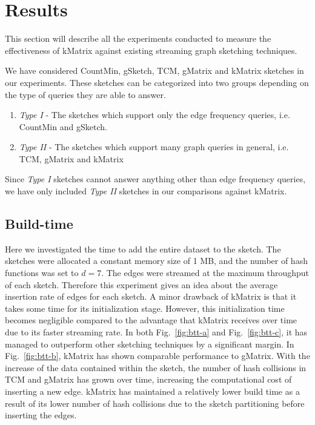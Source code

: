\section{Results}
\label{sec:results}

This section will describe all the experiments conducted to measure the effectiveness of kMatrix against existing streaming graph sketching techniques. 

We have considered CountMin, gSketch, TCM, gMatrix and kMatrix sketches in our experiments. These sketches can be categorized into two groups depending on the type of queries they are able to answer.

\begin{enumerate}
    \item \emph{Type I} - The sketches which support only the edge frequency queries, i.e. CountMin and gSketch.
    \item \emph{Type II} - The sketches which support many graph queries in general, i.e. TCM, gMatrix and kMatrix
\end{enumerate}

Since \emph{Type I} sketches cannot answer anything other than edge frequency queries, we have only included \emph{Type II} sketches in our comparisons against kMatrix.

\subsection{Build-time}

Here we investigated the time to add the entire dataset to the sketch. The sketches were allocated a constant memory size of 1 MB, and the number of hash functions was set to \(d = 7\). The edges were streamed at the maximum throughput of each sketch. Therefore this experiment gives an idea about the average insertion rate of edges for each sketch. A minor drawback of kMatrix is that it takes some time for its initialization stage. However, this initialization time becomes negligible compared to the advantage that kMatrix receives over time due to its faster streaming rate. In both Fig.~\ref{fig:btt-a} and Fig.~\ref{fig:btt-c}, it has managed to outperform other sketching techniques by a significant margin. In Fig.~\ref{fig:btt-b}, kMatrix has shown comparable performance to gMatrix. With the increase of the data contained within the sketch, the number of hash collisions in TCM and gMatrix has grown over time, increasing the computational cost of inserting a new edge. kMatrix has maintained a relatively lower build time as a result of its lower number of hash collisions due to the sketch partitioning before inserting the edges.

